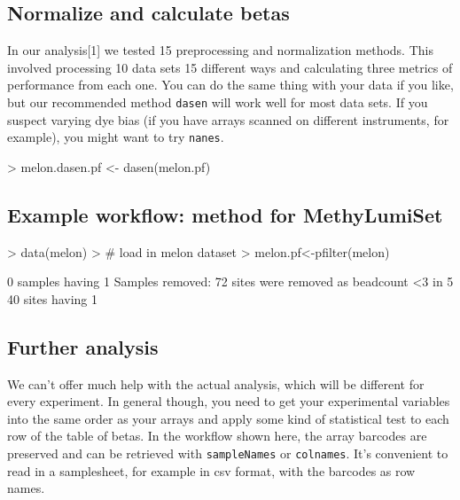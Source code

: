 \documentclass[11pt]{article}
\newcommand{\Rfunction}[1]{{\texttt{#1}}}
\begin{document}
\subsection{Normalize and calculate betas}

In our analysis[1] we tested 15 preprocessing and normalization methods.  
This involved processing 10 data sets 15 different ways and calculating three
metrics of performance from each one.  You can do the same thing with 
your data if you like, but our recommended method \Rfunction{dasen}
will work well for most data sets.  If you suspect varying dye bias (if
you have arrays scanned on different instruments, for example), you might 
want to try \Rfunction{nanes}.

\begin{Schunk}
\begin{Sinput}
> melon.dasen.pf <- dasen(melon.pf)
\end{Sinput}
\end{Schunk}

\subsection{Example workflow: method for MethyLumiSet}
\begin{Schunk}
\begin{Sinput}
> data(melon)		                     
> # load in melon dataset
> melon.pf<-pfilter(melon)	         
\end{Sinput}
\begin{Soutput}
0 samples having 1 %
Samples removed:  
72 sites were removed as beadcount <3 in 5 %
40 sites having 1 %
\end{Soutput}
\end{Schunk}

\subsection{Further analysis}
We can't offer much help with the actual analysis, which will be different 
for every experiment.  In general though, you need to get your experimental
variables into the same order as your arrays and apply some kind of statistical
test to each row of the table of betas.  In the workflow shown here, the
array barcodes are preserved and can be retrieved with \Rfunction{sampleNames} 
or \Rfunction{colnames}.  It's convenient to read in a samplesheet, for
example in csv format, with the barcodes as row names.
\end{document}
